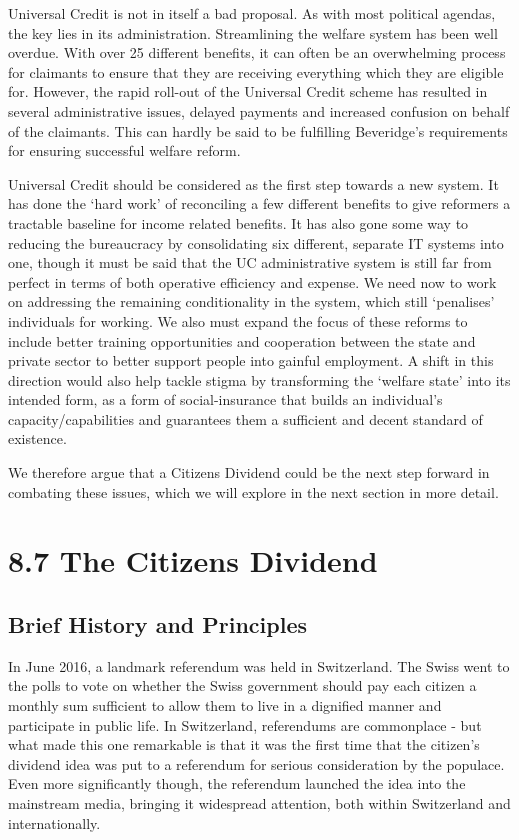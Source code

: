 \documentclass[]{tufte-handout}
\begin{document}
Universal Credit is not in itself a bad proposal. As with most political
agendas, the key lies in its administration. Streamlining the welfare
system has been well overdue. With over 25 different benefits, it can
often be an overwhelming process for claimants to ensure that they are
receiving everything which they are eligible for. However, the rapid
roll-out of the Universal Credit scheme has resulted in several
administrative issues, delayed payments and increased confusion on
behalf of the claimants. This can hardly be said to be fulfilling
Beveridge's requirements for ensuring successful welfare reform.

Universal Credit should be considered as the first step towards a new
system. It has done the `hard work' of reconciling a few different
benefits to give reformers a tractable baseline for income related
benefits. It has also gone some way to reducing the bureaucracy by
consolidating six different, separate IT systems into one, though it
must be said that the UC administrative system is still far from perfect
in terms of both operative efficiency and expense. We need now to work
on addressing the remaining conditionality in the system, which still
`penalises' individuals for working. We also must expand the focus of
these reforms to include better training opportunities and cooperation
between the state and private sector to better support people into
gainful employment. A shift in this direction would also help tackle
stigma by transforming the `welfare state' into its intended form, as a
form of social-insurance that builds an individual's
capacity/capabilities and guarantees them a sufficient and decent
standard of existence.

We therefore argue that a Citizens Dividend could be the next step
forward in combating these issues, which we will explore in the next
section in more detail.

\hypertarget{the-citizens-dividend}{%
\section{8.7 The Citizens Dividend}\label{the-citizens-dividend}}

\hypertarget{brief-history-and-principles}{%
\subsection{Brief History and
Principles}\label{brief-history-and-principles}}

In June 2016, a landmark referendum was held in Switzerland. The Swiss
went to the polls to vote on whether the Swiss government should pay
each citizen a monthly sum sufficient to allow them to live in a
dignified manner and participate in public life. In Switzerland,
referendums are commonplace - but what made this one remarkable is that
it was the first time that the citizen's dividend idea was put to a
referendum for serious consideration by the populace. Even more
significantly though, the referendum launched the idea into the
mainstream media, bringing it widespread attention, both within
Switzerland and internationally.
\end{document}
